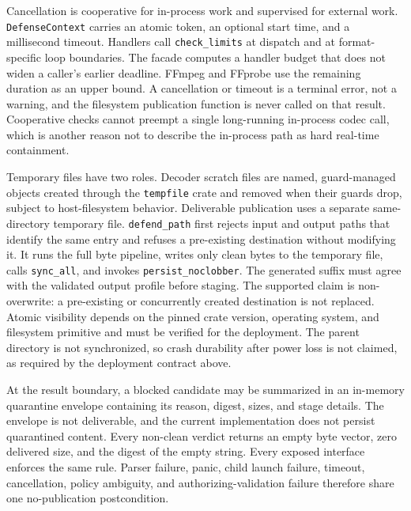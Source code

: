 Cancellation is cooperative for in-process work and supervised for external
work. \texttt{DefenseContext} carries an atomic token, an optional start time,
and a millisecond timeout. Handlers call \texttt{check\_limits} at dispatch and
at format-specific loop boundaries. The facade computes a handler budget that
does not widen a caller's earlier deadline. FFmpeg and FFprobe use the
remaining duration as an upper bound. A cancellation or timeout is a terminal
error, not a warning, and the filesystem publication function is never called
on that result. Cooperative checks cannot preempt a single long-running
in-process codec call, which is another reason not to describe the in-process
path as hard real-time containment.

Temporary files have two roles. Decoder scratch files are named, guard-managed
objects created through the \texttt{tempfile} crate and removed when their
guards drop, subject to host-filesystem behavior. Deliverable publication uses
a separate same-directory temporary file. \texttt{defend\_path} first rejects
input and output paths that identify the same entry and refuses a pre-existing
destination without modifying it. It runs the full byte pipeline, writes only
clean bytes to the temporary file, calls \texttt{sync\_all}, and invokes
\texttt{persist\_noclobber}. The generated suffix must agree with the validated
output profile before staging. The supported claim is non-overwrite: a
pre-existing or concurrently created destination is not replaced. Atomic
visibility depends on the pinned crate version, operating system, and filesystem
primitive and must be verified for the deployment. The parent directory is not
synchronized, so crash durability after power loss is not claimed, as required
by the deployment contract above.

At the result boundary, a blocked candidate may be summarized in an in-memory
quarantine envelope containing its reason, digest, sizes, and stage details.
The envelope is not deliverable, and the current implementation does not persist
quarantined content. Every non-clean verdict returns an empty byte vector, zero
delivered size, and the digest of the empty string. Every exposed interface
enforces the same rule. Parser failure, panic, child launch failure, timeout,
cancellation, policy ambiguity, and authorizing-validation failure therefore
share one no-publication postcondition.
